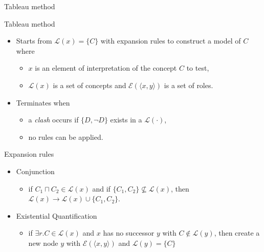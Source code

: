 \documentclass{beamer}
\begin{document}
\begin{frame}{Tableau method}
\scriptsize
\begin{block}{Tableau method}
\begin{itemize}
\item Starts from  $\mathcal{L}(x)=\{C\}$ with expansion rules to construct a model of $C$ where
  \begin{itemize}
  \item \scriptsize $x$ is an element of interpretation of the concept $C$ to test,
  \item $\mathcal{L}(x)$ is a set of concepts and $\mathcal{E}(\langle x,y\rangle)$ is  a set of roles. 
  \end{itemize}
\item Terminates when 
  \begin{itemize}
  \item \scriptsize a \textit{clash} occurs if $\{D,\neg D\}$ exists in a  $\mathcal{L}(\cdot)$,
  \item no rules can be applied.
  \end{itemize}
\end{itemize}
\end{block}


\begin{exampleblock}{Expansion rules}
\begin{itemize}
	 \item \scriptsize Conjunction
	       \begin{itemize}
	        \item  \scriptsize if $C_1\sqcap C_2\in \mathcal{L}(x)$ and if $\{C_1,C_2\}\nsubseteq \mathcal{L}(x)$, then $ \mathcal{L}(x)\rightarrow  \mathcal{L}(x)\cup \{C_1,C_2\}$.
	       \end{itemize}
	 \item \scriptsize Existential Quantification
	       \begin{itemize}\scriptsize
	       \item  \scriptsize if $\exists r.C\in \mathcal{L}(x)$ and $x$ has no successor $y$ with $C\notin \mathcal{L}(y)$, then create a new node $y$ with $\mathcal{E}(\langle x,y\rangle)$ and $\mathcal{L}(y)=\{C\}$
	       \end{itemize}


\end{itemize}
\end{exampleblock}
\end{frame}
\end{document}
